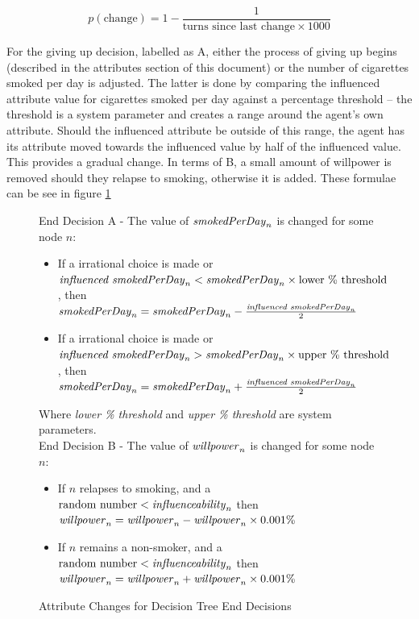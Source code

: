 \documentclass[]{report}
\begin{document}
\begin{equation}
\label{eq:turns}
p(\text{change}) = 1-\frac{1}{\text{turns since last change}\times 1000}
\end{equation}

For the giving up decision, labelled as A, either the process of giving up begins (described in the attributes section of this document) or the number of cigarettes smoked per day is adjusted. The latter is done by comparing the influenced attribute value for cigarettes smoked per day against a percentage threshold – the threshold is a system parameter and creates a range around the agent's own attribute. Should the influenced attribute be outside of this range, the agent has its attribute moved towards the influenced value by half of the influenced value. This provides a gradual change. In terms of B, a small amount of willpower is removed should they relapse to smoking, otherwise it is added. These formulae can be see in figure \ref{eq:end-attr}
\begin{figure}
\label{eq:end-attr}
End Decision A - The value of $\text{\emph{smokedPerDay}}_{n}$ is changed for some node $n$:
\begin{itemize}
\item If a irrational choice is made or $\text{\emph{influenced smokedPerDay}}_{n} < \text{\emph{smokedPerDay}}_{n}\times\text{lower \% threshold}$, then $\text{\emph{smokedPerDay}}_{n} = \text{\emph{smokedPerDay}}_{n} - \frac{\text{\emph{influenced smokedPerDay}}_{n}}{2}$ 
\item If a irrational choice is made or $\text{\emph{influenced smokedPerDay}}_{n} > \text{\emph{smokedPerDay}}_{n}\times\text{upper \% threshold}$, then $\text{\emph{smokedPerDay}}_{n} = \text{\emph{smokedPerDay}}_{n} + \frac{\text{\emph{influenced smokedPerDay}}_{n}}{2}$
\end{itemize}
Where \emph{lower \% threshold} and \emph{upper \% threshold} are system parameters.\\

End Decision B - The value of $\text{\emph{willpower}}_{n}$ is changed for some node $n$:
\begin{itemize}
\item If $n$ relapses to smoking, and a $\text{random number} < \text{\emph{influenceability}}_{n}$ then $\text{\emph{willpower}}_{n} = \text{\emph{willpower}}_{n} - \text{\emph{willpower}}_{n}\times 0.001\%$
\item If $n$ remains a non-smoker, and a $\text{random number} < \text{\emph{influenceability}}_{n}$ then $\text{\emph{willpower}}_{n} = \text{\emph{willpower}}_{n} + \text{\emph{willpower}}_{n}\times 0.001\%$
\end{itemize}
\caption{Attribute Changes for Decision Tree End Decisions}
\end{figure}
\end{document}
